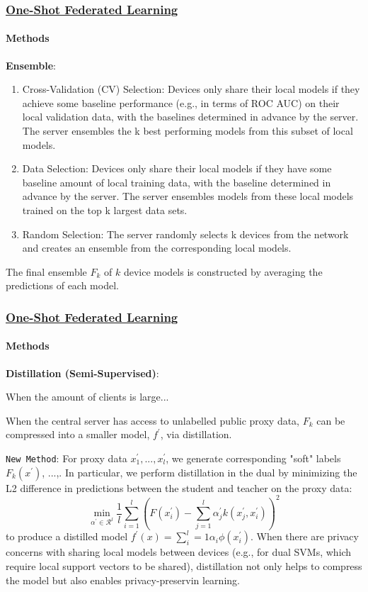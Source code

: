 \documentclass[10pt]{beamer}
\begin{document}
    \begin{frame}
        \frametitle{
            \href{https://arxiv.org/pdf/1902.11175.pdf}{
                One-Shot Federated Learning
            }
        }
        
        \framesubtitle{
            Methods
        }

        \textbf{Ensemble}: 
        \begin{enumerate}
            \item Cross-Validation (CV) Selection: Devices only share their local models if they achieve some baseline performance (e.g., in terms of ROC AUC) on their local validation data, with the baselines determined in advance by the server. The server ensembles the k best performing models from this subset of local models.
            \item Data Selection: Devices only share their local models if they have some baseline amount of local training data, with the baseline determined in advance by the server. The server ensembles models from these local models trained on the top k largest data sets.
            \item Random Selection: The server randomly selects k devices from the network and creates an ensemble from the corresponding local models.
        \end{enumerate}
        The final ensemble $ F_k $ of $ k $ device models is constructed by averaging the predictions of each model.
        

    \end{frame}

    \begin{frame}
        \frametitle{
            \href{https://arxiv.org/pdf/1902.11175.pdf}{
                One-Shot Federated Learning
            }
        }
        
        \framesubtitle{
            Methods
        }

        \textbf{Distillation (Semi-Supervised)}: 

        When the amount of clients is large... 

        When the central server has access to unlabelled public proxy data, $ F_k $ can be compressed into a smaller model, $ f^{\prime} $, via distillation.

        \texttt{New Method}: For proxy data $ x^{\prime}_1, ..., x^{\prime}_l$, we generate corresponding "soft" labels $ F_k(x^{\prime}) $, ...,. In particular, we perform distillation in the dual by minimizing the L2 difference in predictions between the student and teacher on the proxy data:
        $$
            \min_{\alpha^\prime \in \mathcal{R}^l} \frac{1}{l} \sum^l_{i=1}(F(x^\prime_i) - \sum_{j=1}^l \alpha^\prime_j k(x_j^\prime, x_i^\prime))^2
        $$
        to produce a distilled model $ f^\prime(x) = \sum^l_i=1 \alpha_i \phi (x^\prime_i) $. When there are privacy concerns with sharing local models between devices (e.g., for dual SVMs, which require local support vectors to be shared), distillation not only helps to compress the model but also enables privacy-preservin learning.
        

    \end{frame}
\end{document}
